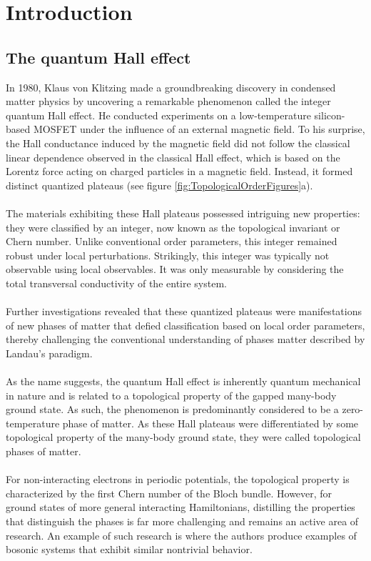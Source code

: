 \chapter{Introduction}\label{ch:introduction}
\section{The quantum Hall effect}
In 1980, Klaus von Klitzing made a groundbreaking discovery in condensed matter physics by uncovering a remarkable phenomenon called the integer quantum Hall effect. He conducted experiments on a low-temperature silicon-based MOSFET under the influence of an external magnetic field. To his surprise, the Hall conductance induced by the magnetic field did not follow the classical linear dependence observed in the classical Hall effect, which is based on the Lorentz force acting on charged particles in a magnetic field. Instead, it formed distinct quantized plateaus (see figure \ref{fig:TopologicalOrderFigures}a).
\\\\
The materials exhibiting these Hall plateaus possessed intriguing new properties: they were classified by an integer, now known as the topological invariant or Chern number. Unlike conventional order parameters, this integer remained robust under local perturbations. Strikingly, this integer was typically not observable using local observables. It was only measurable by considering the total transversal conductivity of the entire system.
\\\\
Further investigations revealed that these quantized plateaus were manifestations of new phases of matter that defied classification based on local order parameters, thereby challenging the conventional understanding of phases matter described by Landau's paradigm.
\\\\
As the name suggests, the quantum Hall effect is inherently quantum mechanical in nature and is related to a topological property of the gapped many-body ground state. As such, the phenomenon is predominantly considered to be a zero-temperature phase of matter. As these Hall plateaus were differentiated by some topological property of the many-body ground state, they were called topological phases of matter.
\\\\
For non-interacting electrons in periodic potentials, the topological property is characterized by the first Chern number of the Bloch bundle. However, for ground states of more general interacting Hamiltonians, distilling the properties that distinguish the phases is far more challenging and remains an active area of research. An example of such research is \cite{sopenko2023chiral} where the authors produce examples of bosonic systems that exhibit similar nontrivial behavior.
